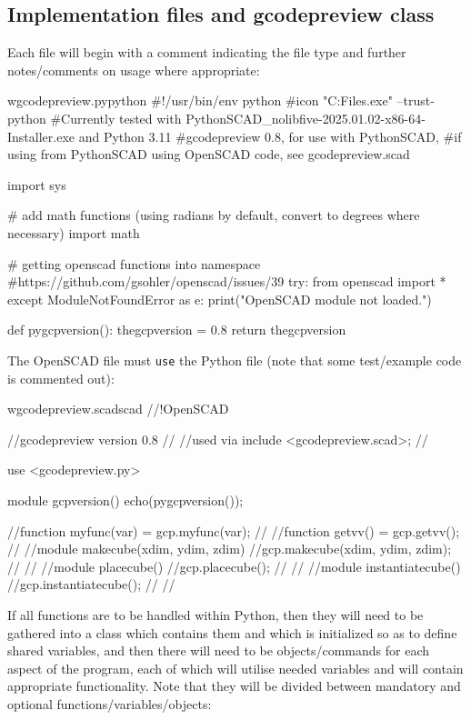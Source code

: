 \documentclass{ltxdoc}
\begin{document}
\subsection{Implementation files and gcodepreview class}
 
Each file will begin with a comment indicating the file type and further notes/comments on usage where appropriate:

\begin{writecode}{w}{gcodepreview.py}{python}
#!/usr/bin/env python
#icon "C:\Program Files\PythonSCAD\bin\openscad.exe"  --trust-python
#Currently tested with PythonSCAD_nolibfive-2025.01.02-x86-64-Installer.exe and Python 3.11
#gcodepreview 0.8, for use with PythonSCAD, 
#if using from PythonSCAD using OpenSCAD code, see gcodepreview.scad

import sys

# add math functions (using radians by default, convert to degrees where necessary)
import math

# getting openscad functions into namespace
#https://github.com/gsohler/openscad/issues/39
try:
    from openscad import *
except ModuleNotFoundError as e:
    print("OpenSCAD module not loaded.")
    
def pygcpversion():
    thegcpversion = 0.8
    return thegcpversion

\end{writecode}
\addtocounter{gcpy}{23}

The OpenSCAD file must \verb|use| the Python file (note that some test/example code is commented out):

\begin{writecode}{w}{gcodepreview.scad}{scad}
//!OpenSCAD
 
//gcodepreview version 0.8
//
//used via include <gcodepreview.scad>;
//

use <gcodepreview.py>

module gcpversion(){
echo(pygcpversion());
}

//function myfunc(var) = gcp.myfunc(var);
//
//function getvv() = gcp.getvv();
//
//module makecube(xdim, ydim, zdim){
//gcp.makecube(xdim, ydim, zdim);
//}
//
//module placecube(){
//gcp.placecube();
//}
//
//module instantiatecube(){
//gcp.instantiatecube();
//}
//
\end{writecode}
\addtocounter{gcpscad}{30}

If all functions are to be handled within Python, then they will need to be gathered into a class which contains them and which is initialized so as to define shared variables, and then there will need to be objects/commands for each aspect of the program, each of which will utilise needed variables and will contain appropriate functionality. Note that they will be divided between mandatory and optional functions/variables/objects:
\end{document}
